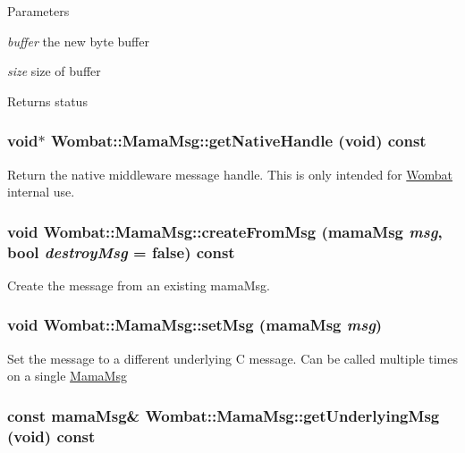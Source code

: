 \begin{DoxyParams}{Parameters}
\item[{\em buffer}]the new byte buffer \item[{\em size}]size of buffer \end{DoxyParams}
\begin{DoxyReturn}{Returns}
status 
\end{DoxyReturn}
\hypertarget{classWombat_1_1MamaMsg_ae8733094602de66fa1e886e7f2b2c0d0}{
\subsubsection[{getNativeHandle}]{\setlength{\rightskip}{0pt plus 5cm}void$\ast$ Wombat::MamaMsg::getNativeHandle (void) const}}
\label{classWombat_1_1MamaMsg_ae8733094602de66fa1e886e7f2b2c0d0}


Return the native middleware message handle. This is only intended for \hyperlink{namespaceWombat}{Wombat} internal use. \hypertarget{classWombat_1_1MamaMsg_a4dfe79770a6a552e2b4592af021a63ca}{
\subsubsection[{createFromMsg}]{\setlength{\rightskip}{0pt plus 5cm}void Wombat::MamaMsg::createFromMsg (mamaMsg {\em msg}, \/  bool {\em destroyMsg} = {\ttfamily false}) const}}
\label{classWombat_1_1MamaMsg_a4dfe79770a6a552e2b4592af021a63ca}


Create the message from an existing mamaMsg. \hypertarget{classWombat_1_1MamaMsg_abe271a7c85f9384143c4a4d9ac51d7df}{
\subsubsection[{setMsg}]{\setlength{\rightskip}{0pt plus 5cm}void Wombat::MamaMsg::setMsg (mamaMsg {\em msg})}}
\label{classWombat_1_1MamaMsg_abe271a7c85f9384143c4a4d9ac51d7df}


Set the message to a different underlying C message. Can be called multiple times on a single \hyperlink{classWombat_1_1MamaMsg}{MamaMsg} \hypertarget{classWombat_1_1MamaMsg_ad2f5fc395e464a7042e30e74e411bc2e}{
\subsubsection[{getUnderlyingMsg}]{\setlength{\rightskip}{0pt plus 5cm}const mamaMsg\& Wombat::MamaMsg::getUnderlyingMsg (void) const}}
\label{classWombat_1_1MamaMsg_ad2f5fc395e464a7042e30e74e411bc2e}


